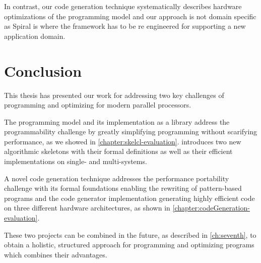 In contrast, our code generation technique systematically describes hardware optimizations of the \OpenCL programming model and our approach is not domain specific as Spiral is where the framework has to be re engineered for supporting a new application domain.




\section{Conclusion}
This thesis has presented our work for addressing two key challenges of programming and optimizing for modern parallel processors.

The \SkelCL programming model and its implementation as a \Cpp library address the programmability challenge by greatly simplifying programming without scarifying performance, as we showed in \autoref{chapter:skelcl-evaluation}.
\SkelCL introduces two new algorithmic skeletons with their formal definitions as well as their efficient implementations on single- and multi-\GPU systems.

A novel code generation technique addresses the performance portability challenge with its formal foundations enabling the rewriting of pattern-based programs and the code generator implementation generating highly efficient \OpenCL code on three different hardware architectures, as shown in \autoref{chapter:codeGeneration-evaluation}.

These two projects can be combined in the future, as described in \autoref{ch:seventh}, to obtain a holistic, structured approach for programming and optimizing programs which combines their advantages.



